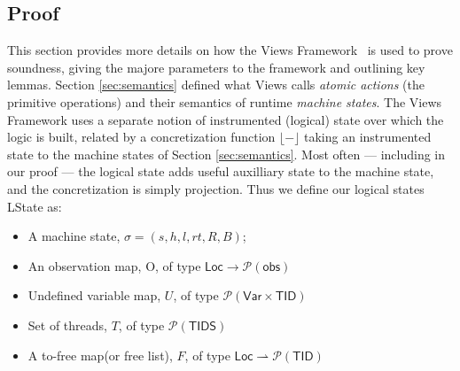 \subsection{Proof}
\label{sec:proof}
This section provides more details on how the Views Framework~\cite{views} is used to prove soundness, giving the majore parameters to the framework and outlining key lemmas.
Section \ref{sec:semantics} defined what Views calls \emph{atomic actions} (the primitive operations) and their semantics of runtime \emph{machine states}.  The Views Framework uses a separate notion of instrumented (logical) state over which the logic is built, related by a concretization function $\lfloor-\rfloor$ taking an instrumented state to the machine states of Section \ref{sec:semantics}.  Most often --- including in our proof ---  the logical state adds useful auxilliary state to the machine state, and the concretization is simply projection.
Thus we define our logical states \textsf{LState} as:
\begin{itemize}
\item A machine state, $\sigma=(s,h,l,rt,R,B)$;
\item An observation map, O, of type $ \textsf{Loc} \to \mathcal{P}(\textsf{obs})$
\item Undefined variable map, $U$, of type $\mathcal{P}(\textsf{Var}\times \textsf{TID})$
\item Set of threads, $T$, of type $\mathcal{P}(\textsf{TIDS})$
\item A to-free map(or free list), $F$, of type $\textsf{Loc} \rightharpoonup \mathcal{P}(\textsf{TID})$
\end{itemize}
